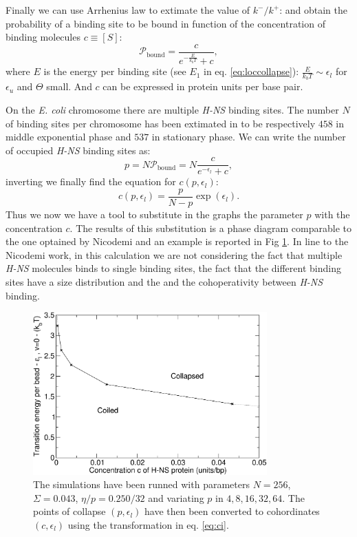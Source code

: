 \documentclass[12pt,a4paper,notitlepage]{article}
\newcommand{\hns}{\emph{H-NS}\xspace}
\newcommand{\ecoli}{\emph{E. coli}\xspace}
\begin{document}
\begin{appendices}
Finally we can use Arrhenius law to extimate the value of
$k^{-}/k^{+}$: and obtain the probability of a binding site to be
bound in function of the concentration of binding molecules $c \equiv
[S]$:
\begin{equation}
\mathscr{P}_{\mathrm{bound}} = \frac{c}{e^{-\frac{E}{k_b T}} + c},
\end{equation}
where $E$ is the energy per binding site (see $E_1$ in 
eq. \ref{eq:loccollapse}): $\frac{E}{k_bT} \sim \epsilon_l$ for
$\epsilon_u$ and $\Theta$ small. And $c$ can be expressed in protein
units per base pair.

On the \ecoli chromosome there are multiple \hns binding sites. The
number $N$ of binding sites per chromosome has been extimated in
\cite{Kahramanoglou2011} to be respectively $458$ in middle
exponential phase and $537$ in stationary phase. We can write the
number of occupied \hns binding sites as:
\begin{equation}
p = N \mathscr{P}_{\mathrm{bound}} = 
    N \frac{c}{e^{-\epsilon_l} + c},
\end{equation}
inverting we finally find the equation for $c(p,
\epsilon_l)$:
\begin{equation}
c(p, \epsilon_l) = \frac{p}{N-p} \exp (\epsilon_l).
\label{eq:ci}
\end{equation}
Thus we now we have a tool to substitute in the graphs the parameter
$p$ with the concentration $c$. The results of this substitution is a
phase diagram comparable to the one optained by Nicodemi
\cite{Barbieri2012} and an example is reported in Fig
\ref{fig:znico}. In line to the Nicodemi work, in this calculation we
are not considering the fact that multiple \hns molecules binds to
single binding sites, the fact that the different binding sites have a
size distribution and the and the cohoperativity between \hns binding.


\begin{figure}[h!]
\centering
\includegraphics[width=9cm]{zNicodemi}
\caption{The simulations have been runned with parameters $N = 256$,
  $\Sigma = 0.043$, $\eta/p = 0.250/32$ and variating $p$ in ${4, 8,
    16, 32, 64}$. The points of collapse $(p, \epsilon_l)$ have then been
  converted to cohordinates $(c, \epsilon_l)$ using the transformation
  in eq. \ref{eq:ci}.
}
\label{fig:znico}
\end{figure}

\end{appendices}

{}

\end{document}
